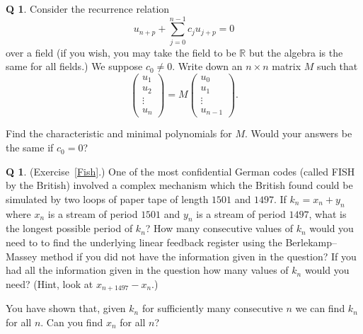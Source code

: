 \documentclass[12pt,a4paper]{article}
\theoremstyle{plain}
\theoremstyle{definition}
\newtheorem{question}[theorem]{Q}
\begin{document}
    \begin{question}
        \label{C4.5}
        Consider the recurrence relation
        \[u_{n+p}+\sum_{j=0}^{n-1}c_{j}u_{j+p}=0\]
        over a field (if you wish, you may take the field
        to be ${\mathbb R}$
        but the algebra is the same for all fields.)
        We suppose $c_{0}\neq 0$.
        Write down an $n\times n$
        matrix $M$ such that
        \[\left(\begin{matrix}
                    u_{1}\\u_{2}\\ \vdots\\u_{n}
        \end{matrix}\right)
        =M\left(\begin{matrix}
                    u_{0}\\u_{1}\\ \vdots\\u_{n-1}
        \end{matrix}\right).\]

        Find the characteristic and minimal polynomials for $M$.
        Would your answers be the same if $c_{0}=0$?
    \end{question}
    \begin{question}
        \label{C4.6}
        (Exercise~\ref{Fish}.)
        One of the most confidential
        German codes (called FISH by the British)
        involved a complex mechanism which
        the British found could be simulated
        by two loops of paper tape of
        length $1501$ and $1497$. If $k_{n}=x_{n}+y_{n}$
        where $x_{n}$ is a stream of period $1501$
        and $y_{n}$ is a stream of period $1497$,
        what is the longest possible period of $k_{n}$?
        How many consecutive values of $k_{n}$ would you
        need to to find the underlying linear feedback register
        using the Berlekamp--Massey method if you did
        not have the information given in the question?
        If you had
        all the information given in the question
        how many values of $k_{n}$ would you need?
        (Hint, look at $x_{n+1497}-x_{n}$.)

        You have shown that, given $k_{n}$ for sufficiently
        many consecutive $n$ we can find $k_{n}$ for all $n$.
        Can you find $x_{n}$ for all $n$?
    \end{question}
\end{document}
